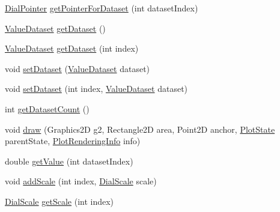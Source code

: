 \begin{DoxyCompactItemize}
\item 
\mbox{\hyperlink{classorg_1_1jfree_1_1chart_1_1plot_1_1dial_1_1_dial_pointer}{Dial\+Pointer}} \mbox{\hyperlink{classorg_1_1jfree_1_1chart_1_1plot_1_1dial_1_1_dial_plot_abd59d7f53c5ae69094033c57936dc709}{get\+Pointer\+For\+Dataset}} (int dataset\+Index)
\item 
\mbox{\hyperlink{interfaceorg_1_1jfree_1_1data_1_1general_1_1_value_dataset}{Value\+Dataset}} \mbox{\hyperlink{classorg_1_1jfree_1_1chart_1_1plot_1_1dial_1_1_dial_plot_aad16922aa6f58ad35ea660ddc42f45fd}{get\+Dataset}} ()
\item 
\mbox{\hyperlink{interfaceorg_1_1jfree_1_1data_1_1general_1_1_value_dataset}{Value\+Dataset}} \mbox{\hyperlink{classorg_1_1jfree_1_1chart_1_1plot_1_1dial_1_1_dial_plot_a782887377943cbc9e72040ccd4ebd960}{get\+Dataset}} (int index)
\item 
void \mbox{\hyperlink{classorg_1_1jfree_1_1chart_1_1plot_1_1dial_1_1_dial_plot_a34b44b646474f3831881c85f8c04e1bf}{set\+Dataset}} (\mbox{\hyperlink{interfaceorg_1_1jfree_1_1data_1_1general_1_1_value_dataset}{Value\+Dataset}} dataset)
\item 
void \mbox{\hyperlink{classorg_1_1jfree_1_1chart_1_1plot_1_1dial_1_1_dial_plot_acb78f99791020bfbf09b7e3e0c1dad45}{set\+Dataset}} (int index, \mbox{\hyperlink{interfaceorg_1_1jfree_1_1data_1_1general_1_1_value_dataset}{Value\+Dataset}} dataset)
\item 
int \mbox{\hyperlink{classorg_1_1jfree_1_1chart_1_1plot_1_1dial_1_1_dial_plot_a32e8f87f59a9d5dc31a806a5dc39f5fc}{get\+Dataset\+Count}} ()
\item 
void \mbox{\hyperlink{classorg_1_1jfree_1_1chart_1_1plot_1_1dial_1_1_dial_plot_a66c9537df3df2147aa46cf39b1b8f65f}{draw}} (Graphics2D g2, Rectangle2D area, Point2D anchor, \mbox{\hyperlink{classorg_1_1jfree_1_1chart_1_1plot_1_1_plot_state}{Plot\+State}} parent\+State, \mbox{\hyperlink{classorg_1_1jfree_1_1chart_1_1plot_1_1_plot_rendering_info}{Plot\+Rendering\+Info}} info)
\item 
double \mbox{\hyperlink{classorg_1_1jfree_1_1chart_1_1plot_1_1dial_1_1_dial_plot_aaf10cc454afc742c01aa1a6bb08bac18}{get\+Value}} (int dataset\+Index)
\item 
void \mbox{\hyperlink{classorg_1_1jfree_1_1chart_1_1plot_1_1dial_1_1_dial_plot_adf9e838616e2fecb14f3662d0382557c}{add\+Scale}} (int index, \mbox{\hyperlink{interfaceorg_1_1jfree_1_1chart_1_1plot_1_1dial_1_1_dial_scale}{Dial\+Scale}} scale)
\item 
\mbox{\hyperlink{interfaceorg_1_1jfree_1_1chart_1_1plot_1_1dial_1_1_dial_scale}{Dial\+Scale}} \mbox{\hyperlink{classorg_1_1jfree_1_1chart_1_1plot_1_1dial_1_1_dial_plot_add61a02d3d7ddb51ca30c4761bfa85d2}{get\+Scale}} (int index)

\end{DoxyCompactItemize}
